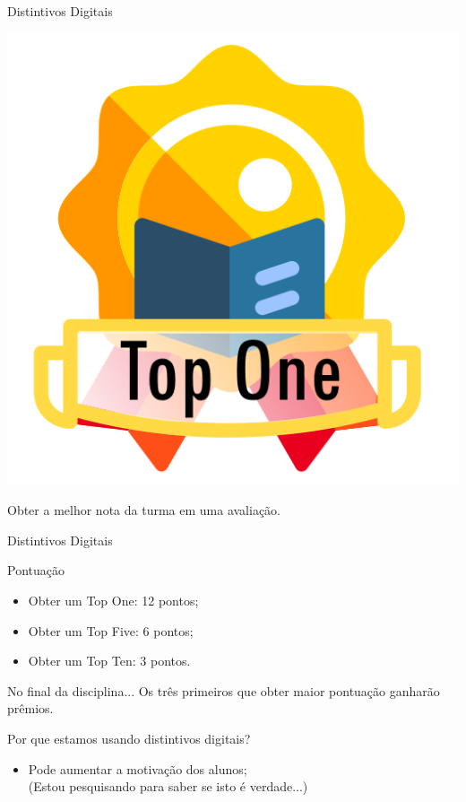 \documentclass[xcolor=dvipsnames,table]{beamer}
\begin{document}
	\begin{frame}{Distintivos Digitais}
		\begin{block}{}
			\begin{center}
	    		\includegraphics[height=.65\textheight]{images/badges/top-one.png}
	  		\end{center}		
	  		Obter a melhor nota da turma em uma avaliação. 
		\end{block}
	\end{frame}
	
	\begin{frame}{Distintivos Digitais}
		\begin{block}{Pontuação}
			\begin{itemize}
				\item Obter um {\sc Top One}: 12 pontos;
				\item Obter um {\sc Top Five}: 6 pontos;
				\item Obter um {\sc Top Ten}: 3 pontos.
			\end{itemize}
		\end{block} \pause
		\begin{exampleblock}{No final da disciplina...}
			Os três primeiros que obter maior pontuação ganharão prêmios.
		\end{exampleblock} \pause
		\begin{block}{Por que estamos usando distintivos digitais?}
			\begin{itemize}
				\item Pode aumentar a motivação dos alunos; \\ \pause
				{\color{blue} (Estou pesquisando para saber se isto é verdade...)}
			\end{itemize}
		\end{block}
	\end{frame}
\end{document}
